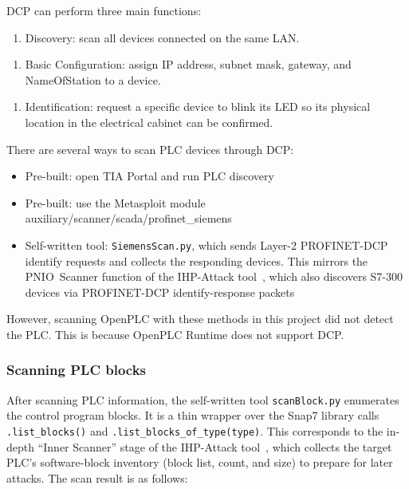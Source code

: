 ﻿\documentclass[../main.tex]{subfiles}
\begin{document}
\begin{enumerate}
DCP can perform three main functions:

\begin{enumerate}
    \item Discovery: scan all devices connected on the same LAN.
\end{enumerate}


\begin{enumerate}
    \item Basic Configuration: assign IP address, subnet mask, gateway, and NameOfStation to a device.
\end{enumerate}


\begin{enumerate}
    \item Identification: request a specific device to blink its LED so its physical location in the electrical cabinet can be confirmed.
\end{enumerate}


There are several ways to scan PLC devices through DCP:


\begin{itemize}
    \item Pre-built: open TIA Portal and run PLC discovery
    \item Pre-built: use the Metasploit module auxiliary/scanner/scada/profinet\_siemens
    \item Self-written tool: \texttt{SiemensScan.py}, which sends Layer-2 PROFINET-DCP identify requests and collects the responding devices. This mirrors the PNIO~Scanner function of the IHP-Attack tool~\cite{alsabbagh2022remote}, which also discovers S7-300 devices via PROFINET-DCP identify-response packets
\end{itemize}


However, scanning OpenPLC with these methods in this project did not detect the PLC. This is because OpenPLC Runtime does not support DCP.


\subsubsection{Scanning PLC blocks}


After scanning PLC information, the self-written tool \texttt{scanBlock.py} enumerates the control program blocks. It is a thin wrapper over the Snap7 library calls \texttt{.list\_blocks()} and \texttt{.list\_blocks\_of\_type(type)}. This corresponds to the in-depth ``Inner Scanner'' stage of the IHP-Attack tool~\cite{alsabbagh2022remote}, which collects the target PLC's software-block inventory (block list, count, and size) to prepare for later attacks. The scan result is as follows:



\end{enumerate}
\end{document}
